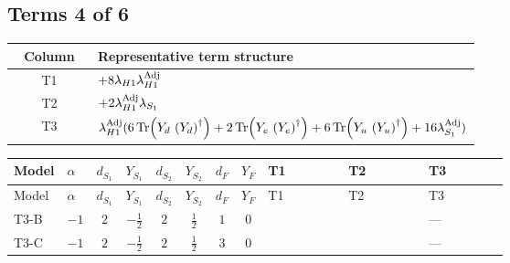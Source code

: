 \documentclass[8pt]{article}
\begin{document}
\begin{landscape}
\subsection*{Terms 4 of 6}
\begin{center}
\begin{tabular}{@{}c >{\raggedright\arraybackslash}p{0.82\linewidth}@{}}
\toprule
Column & Representative term structure \\
\midrule
T1 & \(\displaystyle +8 {\lambda_{H1}} {\lambda_{H1}^{\rm Adj}}\) \\
\midrule
T2 & \(\displaystyle +2 {\lambda_{H1}^{\rm Adj}} {\lambda_{S_1}}\) \\
\midrule
T3 & \(\displaystyle {\lambda_{H1}^{\rm Adj}} (6 \operatorname{Tr}\!\left({Y_d}\,\left({Y_d}\right)^{\dagger}\right)+2 \operatorname{Tr}\!\left({Y_e}\,\left({Y_e}\right)^{\dagger}\right)+6 \operatorname{Tr}\!\left({Y_u}\,\left({Y_u}\right)^{\dagger}\right)+16 {\lambda_{S_1}^{\rm Adj}})\) \\
\midrule
\bottomrule
\end{tabular}
\end{center}
\smallskip
\tiny
\begin{longtable}{@{}llcccccc >{\raggedright\arraybackslash}p{0.21\linewidth} >{\raggedright\arraybackslash}p{0.21\linewidth} >{\raggedright\arraybackslash}p{0.21\linewidth}@{}}
\toprule
Model & $\alpha$ & $d_{S_1}$ & $Y_{S_1}$ & $d_{S_2}$ & $Y_{S_2}$ & $d_F$ & $Y_F$ & T1 & T2 & T3 \\
\midrule
\endfirsthead
\toprule
Model & $\alpha$ & $d_{S_1}$ & $Y_{S_1}$ & $d_{S_2}$ & $Y_{S_2}$ & $d_F$ & $Y_F$ & T1 & T2 & T3 \\
\midrule
\endhead
T3-B & $-1$ & $2$ & $-\frac{1}{2}$ & $2$ & $\frac{1}{2}$ & $1$ & $0$ & \scriptsize\adjustbox{max width=\linewidth}{$\begin{gathered} +8 {\lambda_{H1}} {\lambda_{H1}^{\rm Adj}}\end{gathered}$} & \scriptsize\adjustbox{max width=\linewidth}{$\begin{gathered} +2 {\lambda_{H1}^{\rm Adj}} {\lambda_{S_1}}\end{gathered}$} & --- \\
\midrule
T3-C & $-1$ & $2$ & $-\frac{1}{2}$ & $2$ & $\frac{1}{2}$ & $3$ & $0$ & \scriptsize\adjustbox{max width=\linewidth}{$\begin{gathered} +8 {\lambda_{H1}} {\lambda_{H1}^{\rm Adj}}\end{gathered}$} & \scriptsize\adjustbox{max width=\linewidth}{$\begin{gathered} +2 {\lambda_{H1}^{\rm Adj}} {\lambda_{S_1}}\end{gathered}$} & --- \\

\end{longtable}
\end{landscape}
\end{document}
